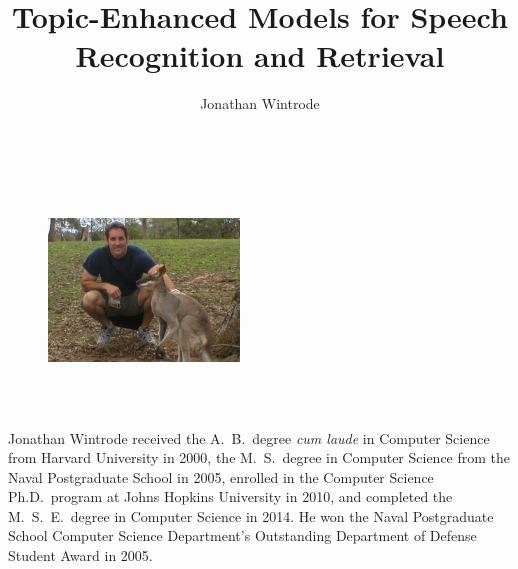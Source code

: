 \documentclass[12pt,oneside,final]{thesis}
\numberwithin{algorithm}{chapter}
\begin{document}
\title{Topic-Enhanced Models for Speech Recognition and Retrieval}
\author{Jonathan Wintrode}
\dissertation
\doctorphilosophy
\copyrightnotice






















\begin{vita}

\begin{figure}
\includegraphics[width=2in,height=2.5in,clip,keepaspectratio]{kangaroo}
\end{figure}

Jonathan Wintrode received the A.\ B.\ degree \textit{cum laude} in Computer Science from Harvard University in 2000, the M.\ S.\ degree in Computer Science from the Naval Postgraduate School in 2005, enrolled in the Computer Science Ph.D.\ program at Johns Hopkins University in 2010, and completed the M.\ S.\ E.\ degree in Computer Science in 2014.  He won the Naval Postgraduate School Computer Science Department's Outstanding Department of Defense Student Award in 2005.

\end{vita}
\end{document}
